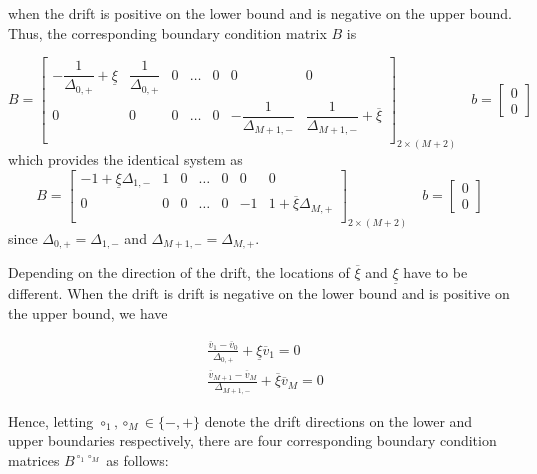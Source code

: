 \documentclass[11pt]{article}
\theoremstyle{definition}
\begin{document}
when the drift is positive on the lower bound and is negative on the upper bound. Thus, the corresponding boundary condition matrix $B$ is

\begin{equation}\label{eq:mixed-barrier-matrix-original}
B = \begin{bmatrix}
-\dfrac{1}{\Delta_{0,+}} + \underline{\xi} & \dfrac{1}{\Delta_{0,+}} & 0 & \dots & 0 & 0 & 0 \\
0 & 0 & 0 & \dots & 0 & -\dfrac{1}{\Delta_{M+1,-}} & \dfrac{1}{\Delta_{M+1,-}} + \overline{\xi}\\
\end{bmatrix}_{2 \times (M+2)} \quad
b = \begin{bmatrix}
0 \\
0
\end{bmatrix}
\end{equation}
which provides the identical system as
\begin{equation}\label{eq:mixed-barrier-matrix}
B = \begin{bmatrix}
-1 +  \underline{\xi} \Delta_{1,-} & 1 & 0 & \dots & 0 & 0 & 0 \\
0 & 0 & 0 & \dots & 0 & -1 & 1 + \overline{\xi} \Delta_{M,+}\\
\end{bmatrix}_{2 \times (M+2)} \quad
b = \begin{bmatrix}
0 \\
0
\end{bmatrix}
\end{equation}
since $\Delta_{0,+} = \Delta_{1,-}$ and $\Delta_{M+1,-} = \Delta_{M,+}$.

Depending on the direction of the drift, the locations of $\overline{\xi}$ and $\underline{\xi}$ have to be different. When the drift is drift is negative on the lower bound and is positive on the upper bound, we have

\begin{align}
&\frac{\overline{v}_1 - \overline{v}_0}{\Delta_{0,+}} + \underline{\xi} \overline{v}_1 = 0 \label{eq:mixed-BC1-irregular-grid-negative}  \\
&\frac{\overline{v}_{M+1} - \overline{v}_M}{\Delta_{M+1,-}} + \overline{\xi} \overline{v}_{M} = 0 \label{eq:mixed-BC2-irregular-grid-positive}
\end{align}

Hence, letting $\circ_1, \circ_M \in \{-, +\}$ denote the drift directions on the lower and upper boundaries respectively, there are four corresponding boundary condition matrices $B^{\circ_1 \circ_M}$ as follows:
\end{document}

